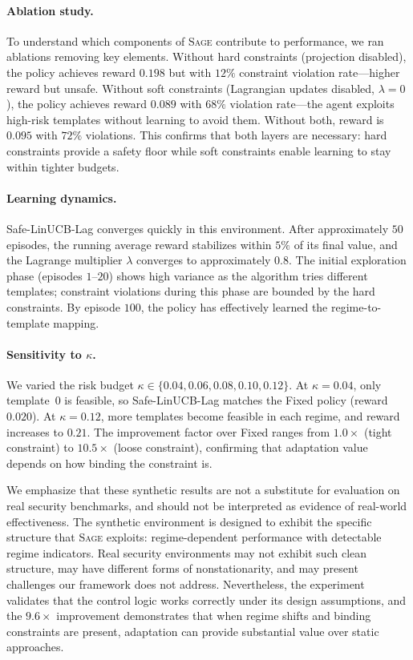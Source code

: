 \documentclass[sigconf,anonymous]{acmart}
\newcommand{\SAGE}{\textsc{Sage}\xspace}
\begin{document}
\paragraph{Ablation study.} To understand which components of \SAGE contribute to performance, we ran ablations removing key elements. Without hard constraints (projection disabled), the policy achieves reward $0.198$ but with $12\%$ constraint violation rate---higher reward but unsafe. Without soft constraints (Lagrangian updates disabled, $\lambda=0$), the policy achieves reward $0.089$ with $68\%$ violation rate---the agent exploits high-risk templates without learning to avoid them. Without both, reward is $0.095$ with $72\%$ violations. This confirms that both layers are necessary: hard constraints provide a safety floor while soft constraints enable learning to stay within tighter budgets.

\paragraph{Learning dynamics.} Safe-LinUCB-Lag converges quickly in this environment. After approximately $50$ episodes, the running average reward stabilizes within $5\%$ of its final value, and the Lagrange multiplier $\lambda$ converges to approximately $0.8$. The initial exploration phase (episodes $1$--$20$) shows high variance as the algorithm tries different templates; constraint violations during this phase are bounded by the hard constraints. By episode $100$, the policy has effectively learned the regime-to-template mapping.

\paragraph{Sensitivity to $\kappa$.} We varied the risk budget $\kappa \in \{0.04, 0.06, 0.08, 0.10, 0.12\}$. At $\kappa=0.04$, only template~$0$ is feasible, so Safe-LinUCB-Lag matches the Fixed policy (reward $0.020$). At $\kappa=0.12$, more templates become feasible in each regime, and reward increases to $0.21$. The improvement factor over Fixed ranges from $1.0\times$ (tight constraint) to $10.5\times$ (loose constraint), confirming that adaptation value depends on how binding the constraint is.

We emphasize that these synthetic results are not a substitute for evaluation on real security benchmarks, and should not be interpreted as evidence of real-world effectiveness. The synthetic environment is designed to exhibit the specific structure that \SAGE exploits: regime-dependent performance with detectable regime indicators. Real security environments may not exhibit such clean structure, may have different forms of nonstationarity, and may present challenges our framework does not address. Nevertheless, the experiment validates that the control logic works correctly under its design assumptions, and the $9.6\times$ improvement demonstrates that when regime shifts and binding constraints are present, adaptation can provide substantial value over static approaches.
\end{document}
